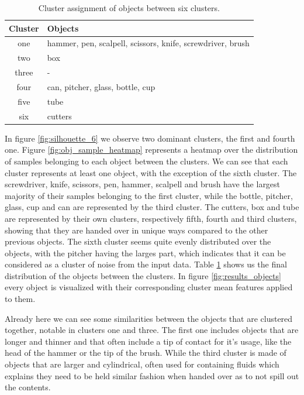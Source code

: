 \begin{table}
	\begin{tabular}{|c|l|}
		\hline
		Cluster & Objects \\
		\hline
		one   & hammer, pen, scalpell, scissors, knife, screwdriver, brush \\
		two   & box \\
		three & - \\
		four  & can, pitcher, glass, bottle, cup \\
		five  & tube \\
		six   & cutters \\
		\hline
	\end{tabular}
	\caption{Cluster assignment of objects between six clusters.}
	\label{tab:object_cluster_assign}
\end{table}

In figure \ref{fig:silhouette_6} we observe two dominant clusters, the first and fourth one. Figure \ref{fig:obj_sample_heatmap} represents a heatmap over the distribution of samples belonging to each object between the clusters. We can see that each cluster represents at least one object, with the exception of the sixth cluster. The screwdriver, knife, scissors, pen, hammer, scalpell and brush have the largest majority of their samples belonging to the first cluster, while the bottle, pitcher, glass, cup and can are represented by the third cluster. The cutters, box and tube are represented by their own clusters, respectively fifth, fourth and third clusters, showing that they are handed over in unique ways compared to the other previous objects. The sixth cluster seems quite evenly distributed over the objects, with the pitcher having the larges part, which indicates that it can be considered as a cluster of noise from the input data. Table \ref{tab:object_cluster_assign} shows us the final distribution of the objects between the clusters. In figure \ref{fig:results_objects} every object is visualized with their corresponding cluster mean features applied to them.

Already here we can see some similarities between the objects that are clustered together, notable in clusters one and three. The first one includes objects that are longer and thinner and that often include a tip of contact for it's usage, like the head of the hammer or the tip of the brush. While the third cluster is made of objects that are larger and cylindrical, often used for containing fluids which explains they need to be held similar fashion when handed over as to not spill out the contents.

